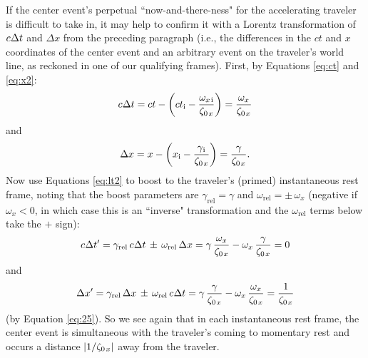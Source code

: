 \documentclass[12pt]{article}
\begin{document}
If the center event's perpetual ``now-and-there-ness" for the accelerating traveler is difficult to take in, it may help to confirm it with a Lorentz transformation of $c \mkern.5mu \Delta t $ and $\Delta x$ from the preceding paragraph (i.e., the differences in the $ct$ and $x$ coordinates of the center event and an arbitrary event on the traveler's world line, as reckoned in one of our qualifying frames). First, by Equations \ref{eq:ct} and \ref{eq:x2}:
\begin{equation*}
c \mkern.5mu \Delta t = ct - \left( ct_{\mathrm{i}} - \dfrac{\omega_{x \mkern2mu \textrm{i} }}{ \zeta_{0 \mkern2mu x}} \right) = \dfrac{\omega_x}{ \zeta_{0 \mkern2mu x}}
\end{equation*}
and
\begin{equation*}
\Delta x = x - \left( x_{\mathrm{i}} - \dfrac{\gamma_{\mkern1mu \textrm{i} }}{ \zeta_{0 \mkern2mu x}} \right) = \dfrac{\gamma}{ \zeta_{0 \mkern2mu x}} .
\end{equation*}
Now use Equations \ref{eq:lt2} to boost to the traveler's (primed) instantaneous rest frame, noting that the boost parameters are $\gamma_{\mathrm{rel}} = \gamma$ and $\omega_{\mathrm{rel}} = \pm \, \omega_x$ (negative if $\omega_x < 0$, in which case this is an ``inverse" transformation and the $\omega_{\textrm{rel}}$ terms below take the $+$ sign):
\begin{equation*}
c \mkern.5mu \Delta t^\prime = \gamma_{\textrm{rel}} \, c \mkern.5mu \Delta t \, \pm \, \omega_{\textrm{rel}} \, \Delta x = \gamma \, \dfrac{\omega_x}{ \zeta_{0 \mkern2mu x}} - \omega_x \, \dfrac{\gamma}{ \zeta_{0 \mkern2mu x}} = 0
\end{equation*}
and
\begin{equation*}
\Delta x^\prime = \gamma_{\textrm{rel}} \, \Delta x \, \pm \, \omega_{\textrm{rel}} \, c \mkern.5mu \Delta t = \gamma \, \dfrac{\gamma}{ \zeta_{0 \mkern2mu x}} - \omega_x \, \dfrac{\omega_x}{ \zeta_{0 \mkern2mu x}} = \dfrac{1}{ \zeta_{0 \mkern2mu x}}
\end{equation*}
(by Equation \ref{eq:25}). So we see again that in each instantaneous rest frame, the center event is simultaneous with the traveler's coming to momentary rest and occurs a distance $|1 / \zeta_{0 \mkern2mu x}|$ away from the traveler.
\end{document}
